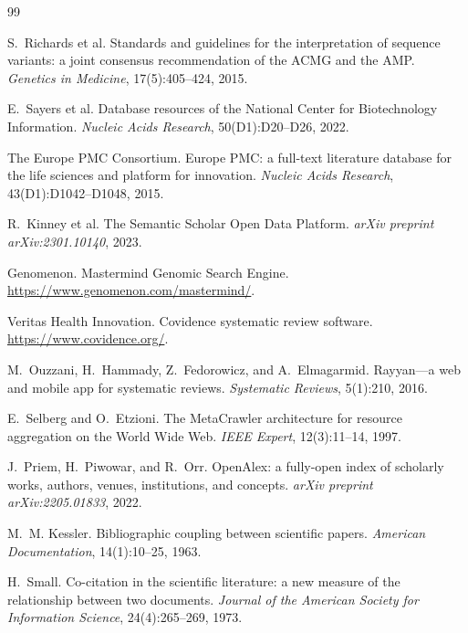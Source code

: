 \documentclass[nonacm,sigconf]{acmart}
\begin{document}

\begin{thebibliography}{99}

S.~Richards et al.
\newblock Standards and guidelines for the interpretation of sequence
variants: a joint consensus recommendation of the ACMG and the AMP.
\newblock \emph{Genetics in Medicine}, 17(5):405--424, 2015.

E.~Sayers et al.
\newblock Database resources of the National Center for Biotechnology
Information.
\newblock \emph{Nucleic Acids Research}, 50(D1):D20--D26, 2022.

The Europe PMC Consortium.
\newblock Europe PMC: a full-text literature database for the life sciences
and platform for innovation.
\newblock \emph{Nucleic Acids Research}, 43(D1):D1042--D1048, 2015.

R.~Kinney et al.
\newblock The Semantic Scholar Open Data Platform.
\newblock \emph{arXiv preprint arXiv:2301.10140}, 2023.

Genomenon.
\newblock Mastermind Genomic Search Engine.
\newblock \url{https://www.genomenon.com/mastermind/}.

Veritas Health Innovation.
\newblock Covidence systematic review software.
\newblock \url{https://www.covidence.org/}.

M.~Ouzzani, H.~Hammady, Z.~Fedorowicz, and A.~Elmagarmid.
\newblock Rayyan---a web and mobile app for systematic reviews.
\newblock \emph{Systematic Reviews}, 5(1):210, 2016.

E.~Selberg and O.~Etzioni.
\newblock The MetaCrawler architecture for resource aggregation on the
World Wide Web.
\newblock \emph{IEEE Expert}, 12(3):11--14, 1997.

J.~Priem, H.~Piwowar, and R.~Orr.
\newblock OpenAlex: a fully-open index of scholarly works, authors, venues,
institutions, and concepts.
\newblock \emph{arXiv preprint arXiv:2205.01833}, 2022.

M.~M. Kessler.
\newblock Bibliographic coupling between scientific papers.
\newblock \emph{American Documentation}, 14(1):10--25, 1963.

H.~Small.
\newblock Co-citation in the scientific literature: a new measure of the
relationship between two documents.
\newblock \emph{Journal of the American Society for Information Science},
24(4):265--269, 1973.


\end{thebibliography}
\end{document}
